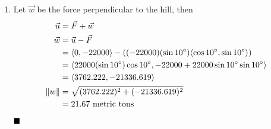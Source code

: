 \begin{enumerate}
\begin{enumerate}[label=(\alph*)]
              \item Let $\vec{w}$ be the force perpendicular to the hill, then
                    \begin{align*}
                        \vec{u}  & = \vec{F} + \vec{w}                                                                                       \\
                        \vec{w}  & = \vec{u} - \vec{F}                                                                                       \\
                                 & = \langle 0, -22000 \rangle - ((-22000)(\sin 10^{\circ})\langle \cos 10^{\circ}, \sin 10^{\circ} \rangle) \\
                                 & = \langle 22000(\sin 10^{\circ})\cos 10^{\circ}, -22000 + 22000\sin 10^{\circ}\sin 10^{\circ} \rangle     \\
                                 & = \langle 3762.222, -21336.619 \rangle                                                                    \\
                        \left\lVert w\right\rVert & = \sqrt{(3762.222)^2 + (-21336.619)^2}                                                                    \\
                                 & = 21.67 \text{ metric tons}
                    \end{align*}
                    $\hfill\blacksquare$
          \end{enumerate}

          \setcounter{enumi}{58}


\end{enumerate}
